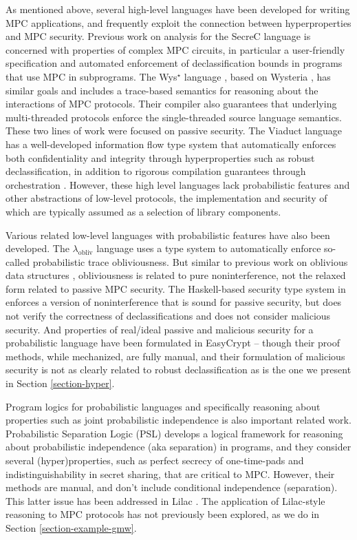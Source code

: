 As mentioned above, several high-level languages have been developed
for writing MPC applications, and frequently exploit the connection
between hyperproperties and MPC security. Previous work on analysis
for the SecreC language
\cite{almeida2018enforcing,10.1145/2637113.2637119} is concerned with
properties of complex MPC circuits, in particular a user-friendly
specification and automated enforcement of declassification bounds in
programs that use MPC in subprograms. The Wys$^\star$ language
\cite{wysstar}, based on Wysteria \cite{rastogi2014wysteria}, has
similar goals and includes a trace-based semantics for reasoning about
the interactions of MPC protocols. Their compiler also guarantees that
underlying multi-threaded protocols enforce the single-threaded source
language semantics. These two lines of work were focused on passive
security. The Viaduct language
\cite{10.1145/3453483.3454074} has a well-developed
information flow type system that automatically enforces both
confidentiality and integrity through hyperproperties such as robust
declassification, in addition to rigorous compilation guarantees
through orchestration \cite{viaduct-UC}. However, these high level
languages lack probabilistic features and other abstractions of
low-level protocols, the implementation and security of which are
typically assumed as a selection of library components.

Various related low-level languages with probabilistic features have
also been developed. The $\lambda_{\mathrm{obliv}}$ language
\cite{darais2019language} uses a type system to automatically
enforce so-called probabilistic trace obliviousness.  But similar to
previous work on oblivious data structures \cite{10.1145/3498713},
obliviousness is related to pure noninterference, not the relaxed form
related to passive MPC security. The Haskell-based security type
system in \cite{6266151} enforces a version of noninterference that is
sound for passive security, but does not verify the correctness of
declassifications and does not consider malicious security. And
properties of real/ideal passive and malicious security for a
probabilistic language have been formulated in EasyCrypt
\cite{8429300}-- though their proof methods, while mechanized, are
fully manual, and their formulation of malicious security is not as
clearly related to robust declassification as is the one we present in
Section \ref{section-hyper}.

Program logics for probabilistic languages and specifically reasoning
about properties such as joint probabilistic independence is also
important related work. Probabilistic Separation Logic (PSL)
\cite{barthe2019probabilistic} develops a logical framework for
reasoning about probabilistic independence (aka separation) in
programs, and they consider several (hyper)properties, such as perfect
secrecy of one-time-pads and indistinguishability in secret sharing,
that are critical to MPC. However, their methods are manual, and
don't include conditional independence (separation). This
latter issue has been addressed in Lilac \cite{li2023lilac}. The
application of Lilac-style reasoning to MPC protocols has not
previously been explored, as we do in Section
\ref{section-example-gmw}.

